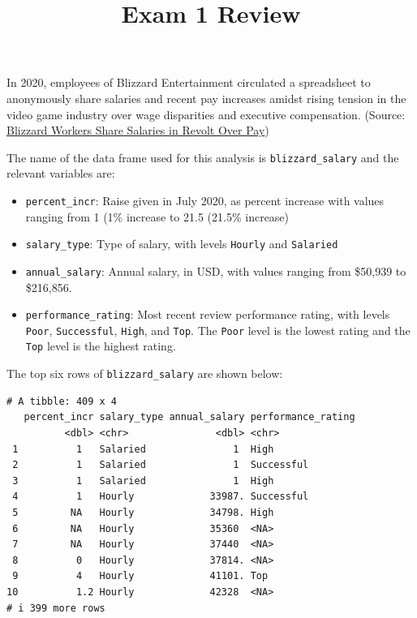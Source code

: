 \documentclass[
  letterpaper,
  DIV=11,
  numbers=noendperiod]{scrartcl}
\title{Exam 1 Review}
\author{}
\date{}
\begin{document}
\maketitle
\ifdefined\Shaded\renewenvironment{Shaded}{\begin{tcolorbox}[enhanced, frame hidden, interior hidden, breakable, borderline west={3pt}{0pt}{shadecolor}, boxrule=0pt, sharp corners]}{\end{tcolorbox}}\fi

In 2020, employees of Blizzard Entertainment circulated a spreadsheet to
anonymously share salaries and recent pay increases amidst rising
tension in the video game industry over wage disparities and executive
compensation. (Source:
\href{https://www.bloomberg.com/news/articles/2020-08-03/blizzard-workers-share-salaries-in-revolt-over-wage-disparities}{Blizzard
Workers Share Salaries in Revolt Over Pay})

The name of the data frame used for this analysis is
\texttt{blizzard\_salary} and the relevant variables are:

\begin{itemize}
\item
  \texttt{percent\_incr}: Raise given in July 2020, as percent increase
  with values ranging from 1 (1\% increase to 21.5 (21.5\% increase)
\item
  \texttt{salary\_type}: Type of salary, with levels \texttt{Hourly} and
  \texttt{Salaried}
\item
  \texttt{annual\_salary}: Annual salary, in USD, with values ranging
  from \$50,939 to \$216,856.
\item
  \texttt{performance\_rating}: Most recent review performance rating,
  with levels \texttt{Poor}, \texttt{Successful}, \texttt{High}, and
  \texttt{Top}. The \texttt{Poor} level is the lowest rating and the
  \texttt{Top} level is the highest rating.
\end{itemize}

The top six rows of \texttt{blizzard\_salary} are shown below:

\begin{verbatim}
# A tibble: 409 x 4
   percent_incr salary_type annual_salary performance_rating
          <dbl> <chr>               <dbl> <chr>             
 1          1   Salaried               1  High              
 2          1   Salaried               1  Successful        
 3          1   Salaried               1  High              
 4          1   Hourly             33987. Successful        
 5         NA   Hourly             34798. High              
 6         NA   Hourly             35360  <NA>              
 7         NA   Hourly             37440  <NA>              
 8          0   Hourly             37814. <NA>              
 9          4   Hourly             41101. Top               
10          1.2 Hourly             42328  <NA>              
# i 399 more rows
\end{verbatim}
\end{document}
